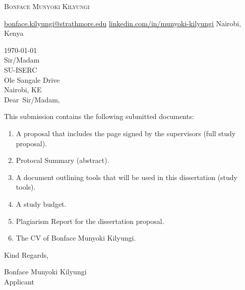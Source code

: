 \documentclass[12pt]{letter}
\makeatletter
\newcommand{\myname}{Bonface Munyoki Kilyungi} %
\newcommand{\mytitle}{Applicant} %
\newcommand{\myemail}{bonface.kilyungi@strathmore.edu} %
\newcommand{\mylinkedin}{munyoki-kilyungi} %
\newcommand{\myphone}{0797107307} %
\newcommand{\mylocation}{Nairobi, Kenya} %
\newcommand{\recipient}{Sir/Madam} %
\newcommand{\greeting}{Dear} %
\newcommand{\closer}{Kind Regards} %
\newcommand{\company}{SU-ISERC} %
\newcommand{\street}{Ole Sangale Drive} %
\newcommand{\city}{Nairobi} %
\newcommand{\state}{KE} %
\newcommand{\zip}{} %
\makeatother
\begin{document}
\AddToShipoutPictureBG{%
\color{gr}
\AtPageUpperLeft{\rule[-1.3in]{\paperwidth}{1.3in}}
}

\begin{center}
{\fontsize{28}{0}\selectfont\scshape \myname}

\href{mailto:\myemail}{\faEnvelope\enspace \myemail}\hfill
\href{https://linkedin.com/in/\mylinkedin}{\faLinkedinIn\enspace linkedin.com/in/\mylinkedin}\hfill
\href{tel:\myphone}{\faPhone\enspace \myphone}\hfill
\faMapMarker\enspace \mylocation
\end{center}

\vspace{0.2in}

\today\\

\vspace{-0.1in}\recipient\\
\company\\
\street\\
\city, \state\ \zip\\

\vspace{-0.1in}\greeting\ \recipient,\\

\vspace{-0.1in}\setlength\parindent{24pt}
\noindent

This submission contains the following submitted documents:

\begin{enumerate}
\item A proposal that includes the page signed by the supervisors (full study proposal).
\item Protocal Summary (abstract).
\item A document outlining tools that will be used in this dissertation (study tools).
\item A study budget.
\item Plagiarism Report for the dissertation proposal.
\item The CV of Bonface Munyoki Kilyungi.
\end{enumerate}

\vspace{0.1in}
\vfill

\begin{flushright}
\closer,


\myname\\
\mytitle
\end{flushright}
\end{document}
